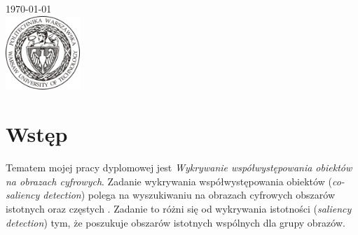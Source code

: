 \documentclass[a4paper,11pt, notitlepage, twosides, openany ]{report}
\begin{document}
\begin{titlepage}
		
		
		{\large \today}\\[2cm] %
		
		
		\includegraphics[width = 28mm]{logo.jpg} %
		
		
		\vfill %
		
	\end{titlepage}
	\tableofcontents
	\newpage
	
	
	\chapter{Wstęp}
	Tematem mojej pracy dyplomowej jest \textit{Wykrywanie współwystępowania obiektów na obrazach cyfrowych}. Zadanie wykrywania współwystępowania obiektów (\textit{co-saliency detection}) polega na wyszukiwaniu na obrazach cyfrowych obszarów istotnych oraz częstych \cite{10.1145/3158674}. Zadanie to różni się od wykrywania istotności (\textit{saliency detection}) tym, że poszukuje obszarów istotnych wspólnych dla grupy obrazów. 
	
\end{document}
